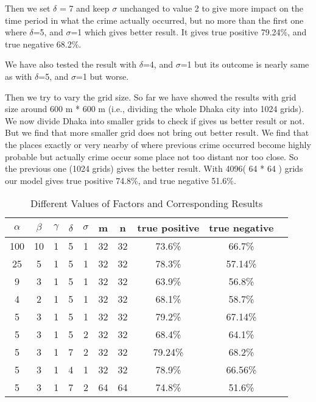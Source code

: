 \documentclass{sig-alternate}
\begin{document}
 
 Then we set $\delta$ = 7 and keep $\sigma$ unchanged to value 2 to give more impact on the time period in what the crime actually occurred, but no more than the first one where $\delta$=5, and $\sigma$=1 which gives better result. 
 It gives true positive 79.24\%, and true negative 68.2\%.
  
  
  
  We have also tested the result with $\delta$=4, and $\sigma$=1 but its outcome is nearly same as with $\delta$=5, and $\sigma$=1 but worse. 
  
  
  Then we try to vary the grid size. So far we have showed the results with grid size around 600 m * 600 m (i.e., dividing the whole Dhaka city into 1024 grids). We now divide Dhaka into smaller grids to check if gives us better result or not. But we find that more smaller grid does not bring out better result. We find that the places exactly or very nearby of where previous crime occurred become highly probable but actually crime occur some place not too distant nor too close. So the previous one (1024 grids) gives the better result. With 4096( 64 * 64 ) grids our model gives true positive 74.8\%, and true negative 51.6\%.
  
    
   
   
   \begin{table}[h]
      \caption{ Different Values of Factors and Corresponding Results}
      \label{results}
      \begin{center}
      \begin{tabular}{|c|c|c|c|c|c|c|c|c|c|}\hline
      $\alpha$ & $\beta$ & $\gamma$ & $\delta$ & $\sigma$ & m & n & true positive & true negative \\ \hline
      100  & 10 & 1 & 5 & 1 & 32 & 32 & 73.6\% & 66.7\%\\ \hline
      25  & 5 & 1 & 5 & 1 & 32 & 32 & 78.3\% & 57.14\%\\ \hline
      9  & 3 & 1 & 5 & 1 & 32 & 32 & 63.9\% & 56.8\%\\ \hline
      4  & 2 & 1 & 5 & 1 & 32 & 32 & 68.1\% & 58.7\%\\ \hline
      5  & 3 & 1 & 5 & 1 & 32 & 32 & 79.2\% & 67.14\%\\ \hline
      5  & 3 & 1 & 5 & 2 & 32 & 32 & 68.4\% & 64.1\%\\ \hline
      5  & 3 & 1 & 7 & 2 & 32 & 32 & 79.24\% & 68.2\%\\ \hline
      5  & 3 & 1 & 4 & 1 & 32 & 32 & 78.9\% & 66.56\%\\ \hline
      5  & 3 & 1 & 7 & 2 & 64 & 64 & 74.8\% &
      51.6\%  \\ \hline
      \end{tabular}
      \end{center}
      \end{table}
   
\end{document}
